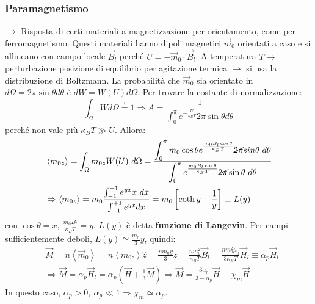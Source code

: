 \documentclass[a4paper]{scrartcl}
\numberwithin{equation}{subsection}
\theoremstyle{style1}
\begin{document}
\subsubsection{Paramagnetismo}
$\to$ Risposta di certi materiali a magnetizzazione per orientamento, come per ferromagnetismo. Questi materiali hanno dipoli magnetici $\vec{m}_0$ orientati a caso e si allineano con campo locale $\vec{B}_l$ perch\'e $U = - \vec{m}_0 \cdot \vec{B}_l$. A temperatura $T\to$ perturbazione posizione di equilibrio per agitazione termica $\to$ si usa la distribuzione di Boltzmann. La probabilit\`a che $\vec{m}_0$ sia orientato in $d\Omega =2\pi \sin \theta  d\theta $ \`e $dW = W(U) d\Omega $. Per trovare la costante di normalizzazione:
\begin{equation}
	\int_{\Omega } W d\Omega \stackrel{!}{=}1 \Rightarrow A = \frac{1}{\int_{0} ^\pi e^{-\frac{U}{\kappa _B T}} 2\pi \sin \theta  d\theta }
\end{equation}
perch\'e non vale pi\`u $\kappa _B T \gg U$. Allora:
\begin{equation}
	\begin{split}
		&\left\langle m_{0z}  \right\rangle= \int_{\Omega } m_{0z} W(U) \ d\Omega = \frac{\displaystyle \int_{0} ^\pi m_0\cos \theta  e^{\frac{m_0B_l \cos \theta }{\kappa _B T}} \cancel{2\pi} sin \theta \ d\theta }{\displaystyle \int_{0} ^\pi e^{\frac{m_0B_l \cos\theta }{\kappa _B T}}\cancel{2\pi} \sin \theta  \ d\theta  }\\
		&\Rightarrow \left\langle m_{0z}  \right\rangle = m_0 \frac{\int_{-1} ^{+1} e^{yx} x \ dx}{\int_{-1} ^{+1} e^{yx} dx}= m_0 \left[ \operatorname{coth} y - \frac{1}{y}  \right] \equiv L(y)
	\end{split}
\end{equation}
con $\cos\theta =x, \ \frac{m_0 B_l}{\kappa _B T}= y$. $L(y)$ \`e detta \textbf{funzione di Langevin}. Per campi sufficientemente deboli, $L(y) \simeq \frac{m_0}{3}y$, quindi:
\begin{equation}
	\begin{split}
		&\vec{M} = n \left\langle \vec{m}_0 \right\rangle= n \left\langle m_{0z}  \right\rangle \hat{z}= \frac{n m_0y}{3} \hat{z}= \frac{nm_0^2}{\kappa _B T} \vec{B}_l	= \frac{nm_0^2\mu_0}{3\kappa _B T}\vec{H}_l \equiv \alpha _p \vec{H}_l\\
		&\Rightarrow \vec{M} = \alpha _p \vec{H}_l = \alpha _p \left(\vec{H}+\frac{1}{3}\vec{M}\right) \Rightarrow \vec{M} = \frac{3 \alpha _p}{3-\alpha _p}\vec{H}\equiv \chi _m \vec{H}
	\end{split}
\end{equation}
In questo caso, $\alpha _p >0, \ \alpha _p \ll 1 \Rightarrow \chi _m \simeq \alpha _p$.
\end{document}
